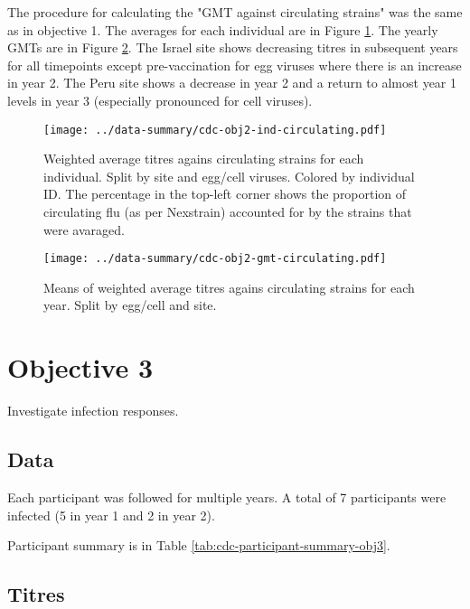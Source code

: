 \documentclass[12pt]{article}
\begin{document}
The procedure for calculating the "GMT against circulating strains" was the same as in objective 1. The averages for each individual are in Figure \ref{fig:cdc-obj2-ind-circulating}. The yearly GMTs are in Figure \ref{fig:cdc-obj2-gmt-circulating}. The Israel site shows decreasing titres in subsequent years for all timepoints except pre-vaccination for egg viruses where there is an increase in year 2. The Peru site shows a decrease in year 2 and a return to almost year 1 levels in year 3 (especially pronounced for cell viruses).

\begin{figure}
	\texttt{[image: ../data-summary/cdc-obj2-ind-circulating.pdf]}
	\caption{Weighted average titres agains circulating strains for each individual. Split by site and egg/cell viruses. Colored by individual ID.  The percentage in the top-left corner shows the proportion of circulating flu (as per Nexstrain) accounted for by the strains that were avaraged.}
	\label{fig:cdc-obj2-ind-circulating}
\end{figure}

\begin{figure}
	\texttt{[image: ../data-summary/cdc-obj2-gmt-circulating.pdf]}
	\caption{Means of weighted average titres agains circulating strains for each year. Split by egg/cell and site.}
	\label{fig:cdc-obj2-gmt-circulating}
\end{figure}

\section{Objective 3}

Investigate infection responses.

\subsection{Data}

Each participant was followed for multiple years. A total of 7 participants
were infected (5 in year 1 and 2 in year 2).

Participant summary is in Table \ref{tab:cdc-participant-summary-obj3}.



\subsection{Titres}
\end{document}

